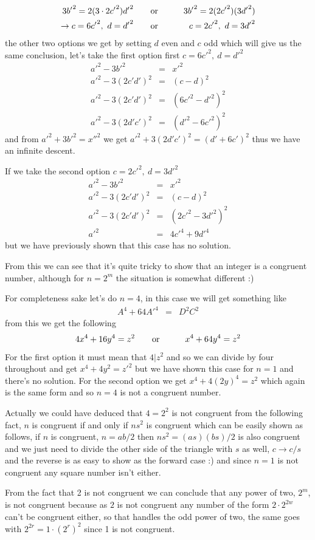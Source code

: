 \documentclass[aps,preprint,preprintnumbers,nofootinbib,showpacs,prd]{revtex4-1}
\newcommand{\nbea}{\begin{eqnarray*}}
\newcommand{\neea}{\end{eqnarray*}}
\begin{document}
%
\nbea
3{b'}^2 = 2 (3\cdot2 {c'}^2){d'}^2 &~~~~~~{\rm or}~~~~~~& 3{b'}^2 = 2 (2 {c'}^2)(3{d'}^2)\\
\to c = 6{c'}^2,~d={d'}^2 &~~~~~~{\rm or}~~~~~~& c = 2{c'}^2,~d=3{d'}^2
\neea
%
the other two options we get by setting $d$ even and $c$ odd which will give us the same conclusion, let's take the first option first $c = 6{c'}^2,~d={d'}^2$
%
\nbea
{a'}^2 - {3{b'}}^2 & = & {x'}^2 \\
{a'}^2 - 3(2c'd')^2 & = & (c-d)^2 \\
{a'}^2 - 3(2c'd')^2 & = & (6{c'}^2-{d'}^2)^2 \\
{a'}^2 - 3(2d'c')^2 & = & ({d'}^2 - 6{c'}^2)^2
\neea
%
and from ${a'}^2 + {3{b'}}^2 = {x''}^2$ we get ${a'}^2 + 3(2d'c')^2 = ({d'} + 6{c'})^2$ thus we have an infinite descent.

If we take the second option $c = 2{c'}^2,~d=3{d'}^2$
%
\nbea
{a'}^2 - {3{b'}}^2 & = & {x'}^2 \\
{a'}^2 - 3(2c'd')^2 & = & (c-d)^2 \\
{a'}^2 - 3(2c'd')^2 & = & (2{c'}^2-3{d'}^2)^2 \\
{a'}^2 & = & 4{c'}^4 + 9{d'}^4
\neea
%
but we have previously shown that this case has no solution.

From this we can see that it's quite tricky to show that an integer is a congruent number, although for $n=2^m$ the situation is somewhat different :)

For completeness sake let's do $n=4$, in this case we will get something like
%
\nbea
A^4 + 64{A'}^4 & = & D^2C^2
\neea
%
from this we get the following
%
\nbea
4x^4 + 16y^4 = z^2 &~~~~~~{\rm or}~~~~~~& x^4 + 64 y^4 = z^2
\neea
%
For the first option it must mean that $4|z^2$ and so we can divide by four throughout and get $x^4 + 4y^2 = {z'}^2$ but we have shown this case for $n=1$ and there's no solution. For the second option we get $x^4 + 4(2y)^4 = z^2$ which again is the same form and so $n=4$ is not a congruent number.

Actually we could have deduced that $4=2^2$ is not congruent from the following fact, $n$ is congruent if and only if $ns^2$ is congruent which can be easily shown as follows, if $n$ is congruent, $n=ab/2$ then $ns^2 = (as)(bs)/2$ is also congruent and we just need to divide the other side of the triangle with $s$ as well, $c\to c/s$ and the reverse is as easy to show as the forward case :) and since $n=1$ is not congruent any square number isn't either.

From the fact that 2 is not congruent we can conclude that any power of two, $2^m$, is not congruent because as $2$ is not congruent any number of the form $2\cdot2^{2w}$ can't be congruent either, so that handles the odd power of two, the same goes with $2^{2r} = 1\cdot (2^{r})^2$ since 1 is not congruent.
\end{document}
